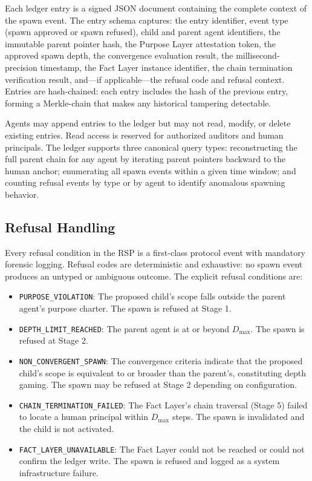 Each ledger entry is a signed JSON document containing the complete context of the spawn event. The entry schema captures: the entry identifier, event type (spawn approved or spawn refused), child and parent agent identifiers, the immutable parent pointer hash, the Purpose Layer attestation token, the approved spawn depth, the convergence evaluation result, the millisecond-precision timestamp, the Fact Layer instance identifier, the chain termination verification result, and—if applicable—the refusal code and refusal context. Entries are hash-chained: each entry includes the hash of the previous entry, forming a Merkle-chain that makes any historical tampering detectable.

Agents may append entries to the ledger but may not read, modify, or delete existing entries. Read access is reserved for authorized auditors and human principals. The ledger supports three canonical query types: reconstructing the full parent chain for any agent by iterating parent pointers backward to the human anchor; enumerating all spawn events within a given time window; and counting refusal events by type or by agent to identify anomalous spawning behavior.

\subsection{Refusal Handling}

Every refusal condition in the RSP is a first-class protocol event with mandatory forensic logging. Refusal codes are deterministic and exhaustive: no spawn event produces an untyped or ambiguous outcome. The explicit refusal conditions are:

\begin{itemize}
    \item \texttt{PURPOSE\_VIOLATION}: The proposed child's scope falls outside the parent agent's purpose charter. The spawn is refused at Stage 1.
    \item \texttt{DEPTH\_LIMIT\_REACHED}: The parent agent is at or beyond $D_{\max}$. The spawn is refused at Stage 2.
    \item \texttt{NON\_CONVERGENT\_SPAWN}: The convergence criteria indicate that the proposed child's scope is equivalent to or broader than the parent's, constituting depth gaming. The spawn may be refused at Stage 2 depending on configuration.
    \item \texttt{CHAIN\_TERMINATION\_FAILED}: The Fact Layer's chain traversal (Stage 5) failed to locate a human principal within $D_{\max}$ steps. The spawn is invalidated and the child is not activated.
    \item \texttt{FACT\_LAYER\_UNAVAILABLE}: The Fact Layer could not be reached or could not confirm the ledger write. The spawn is refused and logged as a system infrastructure failure.
\end{itemize}

